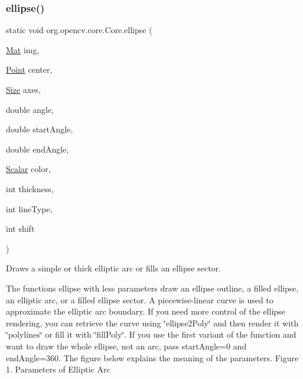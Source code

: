 \subsubsection{\texorpdfstring{ellipse()}{ellipse()}\hspace{0.1cm}{\footnotesize\ttfamily [1/6]}}
{\footnotesize\ttfamily static void org.\+opencv.\+core.\+Core.\+ellipse (\begin{DoxyParamCaption}\item[{\mbox{\hyperlink{classorg_1_1opencv_1_1core_1_1_mat}{Mat}}}]{img,  }\item[{\mbox{\hyperlink{classorg_1_1opencv_1_1core_1_1_point}{Point}}}]{center,  }\item[{\mbox{\hyperlink{classorg_1_1opencv_1_1core_1_1_size}{Size}}}]{axes,  }\item[{double}]{angle,  }\item[{double}]{start\+Angle,  }\item[{double}]{end\+Angle,  }\item[{\mbox{\hyperlink{classorg_1_1opencv_1_1core_1_1_scalar}{Scalar}}}]{color,  }\item[{int}]{thickness,  }\item[{int}]{line\+Type,  }\item[{int}]{shift }\end{DoxyParamCaption})\hspace{0.3cm}{\ttfamily [static]}}

Draws a simple or thick elliptic arc or fills an ellipse sector.

The functions {\ttfamily ellipse} with less parameters draw an ellipse outline, a filled ellipse, an elliptic arc, or a filled ellipse sector. A piecewise-\/linear curve is used to approximate the elliptic arc boundary. If you need more control of the ellipse rendering, you can retrieve the curve using \char`\"{}ellipse2\+Poly\char`\"{} and then render it with \char`\"{}polylines\char`\"{} or fill it with \char`\"{}fill\+Poly\char`\"{}. If you use the first variant of the function and want to draw the whole ellipse, not an arc, pass {\ttfamily start\+Angle=0} and {\ttfamily end\+Angle=360}. The figure below explains the meaning of the parameters. Figure 1. Parameters of Elliptic Arc


